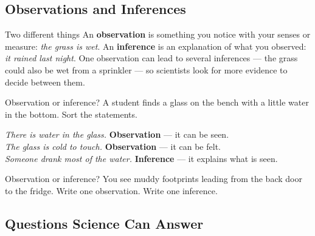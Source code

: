 \rcreset
{}

\label{theory:1}

\subsection{Observations and Inferences}\label{sub:1.1}

\begin{skillbox}{Two different things}
An \textbf{observation} is something you notice with your senses or measure: \emph{the grass is wet}. An \textbf{inference} is an explanation of what you observed: \emph{it rained last night}. One observation can lead to several inferences --- the grass could also be wet from a sprinkler --- so scientists look for more evidence to decide between them.
\end{skillbox}

\begin{workedex}{Observation or inference?}
A student finds a glass on the bench with a little water in the bottom. Sort the statements.

\smallskip
\emph{There is water in the glass.} \textbf{Observation} --- it can be seen.\\
\emph{The glass is cold to touch.} \textbf{Observation} --- it can be felt.\\
\emph{Someone drank most of the water.} \textbf{Inference} --- it explains what is seen.
\end{workedex}

\begin{wedo}{Observation or inference?}
You see muddy footprints leading from the back door to the fridge.
Write one observation.
\answerbox{2.5cm}
Write one inference.
\answerbox{2.5cm}
\end{wedo}

\subsection{Questions Science Can Answer}\label{sub:1.2}

